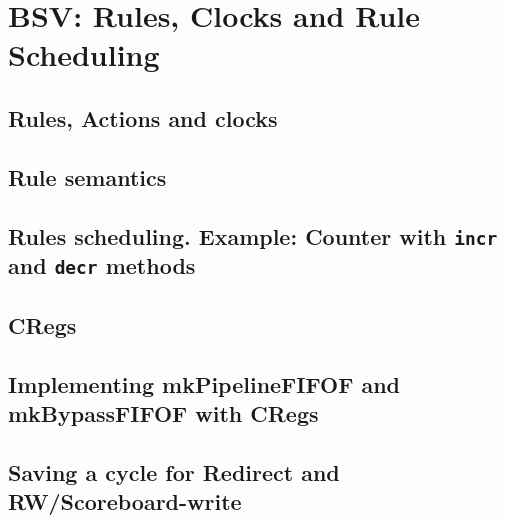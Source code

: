 

\chapter{BSV: Rules, Clocks and Rule  Scheduling}


\setcounter{page}{1}
\renewcommand{\thepage}{\arabic{chapter}-\arabic{page}}

\label{ch_Rules}


\section{Rules, Actions and clocks}

\section{Rule semantics}

\section{Rules scheduling. Example: Counter with {\tt incr} and {\tt decr} methods}

\section{CRegs}

\section{Implementing mkPipelineFIFOF and mkBypassFIFOF with CRegs}

\section{Saving a cycle for Redirect and RW/Scoreboard-write}

